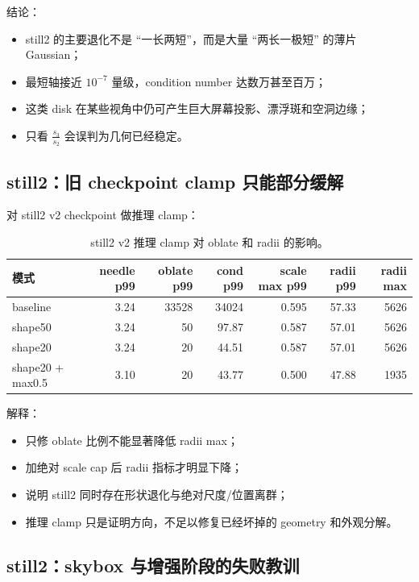 \documentclass[11pt,a4paper]{article}
\begin{document}
结论：
\begin{itemize}[leftmargin=1.5em]
  \item still2 的主要退化不是 ``一长两短''，而是大量 ``两长一极短'' 的薄片 Gaussian；
  \item 最短轴接近 \(10^{-7}\) 量级，condition number 达数万甚至百万；
  \item 这类 disk 在某些视角中仍可产生巨大屏幕投影、漂浮斑和空洞边缘；
  \item 只看 \(\frac{s_3}{s_2}\) 会误判为几何已经稳定。
\end{itemize}

\subsection{still2：旧 checkpoint clamp 只能部分缓解}

对 still2 v2 checkpoint 做推理 clamp：

\begin{table}[h]
\centering
\begin{tabular}{lrrrrrr}
\toprule
模式 & needle p99 & oblate p99 & cond p99 & scale max p99 & radii p99 & radii max \\
\midrule
baseline & 3.24 & 33528 & 34024 & 0.595 & 57.33 & 5626 \\
shape50 & 3.24 & 50 & 97.87 & 0.587 & 57.01 & 5626 \\
shape20 & 3.24 & 20 & 44.51 & 0.587 & 57.01 & 5626 \\
shape20 + max0.5 & 3.10 & 20 & 43.77 & 0.500 & 47.88 & 1935 \\
\bottomrule
\end{tabular}
\caption{still2 v2 推理 clamp 对 oblate 和 radii 的影响。}
\end{table}

解释：
\begin{itemize}[leftmargin=1.5em]
  \item 只修 oblate 比例不能显著降低 radii max；
  \item 加绝对 scale cap 后 radii 指标才明显下降；
  \item 说明 still2 同时存在形状退化与绝对尺度/位置离群；
  \item 推理 clamp 只是证明方向，不足以修复已经坏掉的 geometry 和外观分解。
\end{itemize}

\subsection{still2：skybox 与增强阶段的失败教训}
\end{document}
